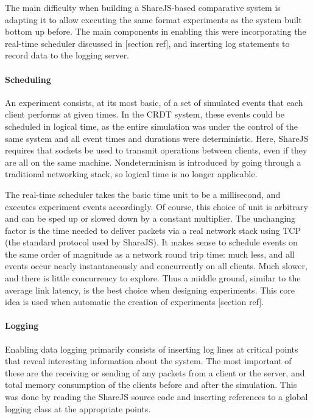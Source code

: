 \documentclass[12pt,a4paper,twoside,openright]{report}
\begin{document}
	The main difficulty when building a ShareJS-based comparative system is adapting it to allow executing the same format experiments as the system built bottom up before. The main components in enabling this were incorporating the real-time scheduler discussed in [section ref], and inserting log statements to record data to the logging server.
	
	\paragraph{Scheduling}
	An experiment consists, at its most basic, of a set of simulated events that each client performs at given times. In the CRDT system, these events could be scheduled in logical time, as the entire simulation was under the control of the same system and all event times and durations were deterministic. Here, ShareJS requires that sockets be used to transmit operations between clients, even if they are all on the same machine. Nondeterminism is introduced by going through a traditional networking stack, so logical time is no longer applicable.
	
	The real-time scheduler takes the basic time unit to be a millisecond, and executes experiment events accordingly. Of course, this choice of unit is arbitrary and can be sped up or slowed down by a constant multiplier. The unchanging factor is the time needed to deliver packets via a real network stack using TCP (the standard protocol used by ShareJS). It makes sense to schedule events on the same order of magnitude as a network round trip time: much less, and all events occur nearly instantaneously and concurrently on all clients. Much slower, and there is little concurrency to explore. Thus a middle ground, similar to the average link latency, is the best choice when designing experiments. This core idea is used when automatic the creation of experiments [section ref].
	
	\paragraph{Logging}
	Enabling data logging primarily consists of inserting log lines at critical points that reveal interesting information about the system. The most important of these are the receiving or sending of any packets from a client or the server, and total memory consumption of the clients before and after the simulation. This was done by reading the ShareJS source code and inserting references to a global logging class at the appropriate points.
	
\end{document}
